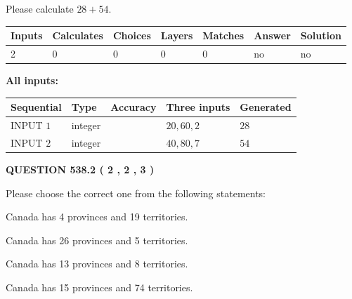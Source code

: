 \documentclass[12pt]{article}
\begin{document}
  
 
Please calculate $ %
28 +  %
54 $.
 
 
   
   
   
   
\noindent\begin{tabular}{|l|l|l|l|l|l|l|}
 \hline
Inputs & Calculates & Choices & Layers & Matches & Answer & Solution \\ \hline
 2  & 
 0  & 
 0
  & 
 0  & 
 0  & 
  no & 
  no 
  \\ \hline
 \end{tabular}
   
   
   
   
\noindent{}
   
   
   
   
\noindent\vspace{0.1in}\hspace{-0.08in} {\textbf{\Large{All inputs: }}}
   
   
  
  
\noindent\begin{tabular}{|l|l|l|l|l|}
\hline
 Sequential & Type & Accuracy & Three inputs & Generated \\ 
\hline
 
 
  INPUT $  1 $ & integer &  & $
 20
 , 
 60
 , 
 2
 $ & $ 28 $ 
 \\  \hline  
 
 
  INPUT $  2 $ & integer &  & $
 40
 , 
 80
 , 
 7
 $ & $ 54 $ 
 \\  \hline  
 \end{tabular}
   
   
  
\vspace{0.2in}
  
{\textbf{\Large{QUESTION
538.2 
 ( 2 , 2 , 3 )
}}}
  
  
Please choose the correct one from the following statements:
 
 
Canada has   4 provinces and  19 territories.
 
 
Canada has  26 provinces and  5 territories.
 
 
Canada has  13 provinces and  8 territories.
 
 
Canada has  15 provinces and  74 territories.
 
\end{document}

